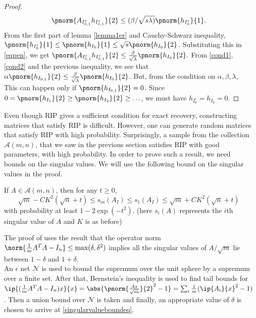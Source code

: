 \begin{proof}
\begin{equation}
			\pnorm{A_{I_{0,1}^c}h_{I_{0,1}^c}}{2}\leq (\beta/\sqrt{s\lambda)}\pnorm{h_{I_0^c}}{1}.
        \end{equation}
    From the first part of lemma \ref{lemma1er} and
	Cauchy-Schwarz inequality, $\pnorm{h_{I_0^c}}{1}\leq
	\pnorm{h_{I_0}}{1}\leq \sqrt{s}\pnorm{h_{I_0}}{2}$.
    Substituting this in \eqref{eqpen}, we get
    $
        \pnorm{A_{I_{0,1}^c}h_{I_{0,1}^c}}{2}\leq \frac{\beta}{\sqrt{\lambda}}\pnorm{h_{I_0}}{2}.
    $
    From \eqref{cond1}, \eqref{cond2} and the previous inequality, we see that
    $
        \alpha \pnorm{h_{I_{0,1}}}{2} \leq \frac{\beta}{\sqrt{\lambda}} \pnorm{h_{I_{0}}}{2}
    $.
    But, from the condition on $\alpha,\beta, \lambda$, This can happen only if $\pnorm{h_{I_{0,1}}}{2} = 0$.
    Since $0 = \pnorm{h_{I_1}}{2}\geq \pnorm{h_{I_2}}{2}\geq \ldots$, we must have $h_{I_0^c} = h_{I_0} = 0$.
\end{proof}

Even though RIP gives a sufficient condition for exact
recovery, constructing matrices that satisfy RIP is difficult.
However, one can generate random matrices that satisfy RIP
with high probability. Surprisingly, a sample from the collection
$\mathcal{A}(m, n)$, that we saw in the previous section
satisfies RIP with good parameters, with high probability.
In order to prove such a result, we need bounds on the singular values.
We will use
the following bound on the singular values in the proof.
\begin{theorem}\label{singularvaluebounds}
	If $A\in\mathcal{A}(m, n)$, then for any
	$t\geq 0$,
	\begin{equation}\label{singularvalueboundeq}
		\sqrt{m} - CK^2(\sqrt{n}+t)\leq s_m(A_I)\leq s_1(A_I)
			\leq \sqrt{m} + CK^2(\sqrt{n}+t)
	\end{equation}
	with probability at least $1-2\exp(-t^2)$. (here $s_i(A)$
	represents the $i$th singular value of $A$ and $K$ is as before)
\end{theorem}
\noindent
The proof of uses the result that the operator norm
$\norm{\frac{1}{m}A^TA - I_n}\leq \max(\delta, \delta^2)$ implies
all the singular values of $A/\sqrt{m}$
lie between $1-\delta$ and $1+\delta$.\\
An $\epsilon$ net $\mathcal{N}$ is used to bound
the supremum over the unit sphere by a supremum over a
finite set.
After that, Bernstein's inequality is used to find tail bounds
for ${\ip{(\frac{1}{m}A^TA-I_n)x}{x}} = 
\abs{\pnorm{\frac{Ax}{\sqrt{m}}}{2}^2 - 1} = 
\sum_i \frac{1}{m}(\ip{A_i}{x}^2-1)$.
Then a union bound over $\mathcal{N}$ is taken
and finally, an appropriate value of $\delta$ is chosen
to arrive at \eqref{singularvalueboundeq}.
\indent

